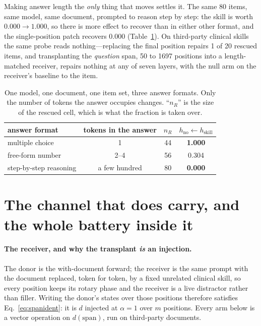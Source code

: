 \documentclass{article}
\newcommand{\dvec}{\ensuremath{d}}
\begin{document}
Making answer length the \emph{only} thing that moves settles it. The same 80
items, same model, same document, prompted to reason step by step: the skill is
worth $0.000 \to 1.000$, so there is more effect to recover than in either other
format, and the single-position patch recovers $\mathbf{0.000}$
(Table~\ref{tab:ladder2}). On third-party clinical skills the same probe reads
nothing---replacing the final position repairs 1 of 20 rescued items, and
transplanting the \emph{question} span, 50 to 1697 positions into a
length-matched receiver, repairs nothing at any of seven layers, with the null
arm on the receiver's baseline to the item.

\begin{table}[t]
\caption{One model, one document, one item set, three answer formats. Only the
number of tokens the answer occupies changes. ``$n_R$'' is the size of the
rescued cell, which is what the fraction is taken over.}
\label{tab:ladder2}
\centering
\small
\begin{tabular}{lccc}
\toprule
answer format & tokens in the answer & $n_R$ & $h_{\text{no}} \leftarrow h_{\text{skill}}$ \\
\midrule
multiple choice        & 1            & 44 & \textbf{1.000} \\
free-form number       & 2--4         & 56 & 0.304 \\
step-by-step reasoning & a few hundred & 80 & \textbf{0.000} \\
\bottomrule
\end{tabular}
\end{table}

\section{The channel that does carry, and the whole battery inside it}
\label{sec:battery}

\paragraph{The receiver, and why the transplant \emph{is} an injection.} The
donor is the with-document forward; the receiver is the same prompt with the
document replaced, token for token, by a fixed unrelated clinical skill, so
every position keeps its rotary phase and the receiver is a live distractor
rather than filler. Writing the donor's states over those positions therefore
satisfies Eq.~\ref{eq:spanident}: it is $\dvec$ injected at $\alpha=1$ over $m$
positions. Every arm below is a vector operation on $\dvec(\text{span})$, run on
third-party documents.
\end{document}
